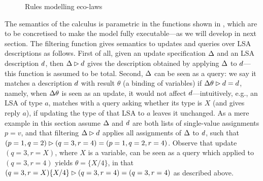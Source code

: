 \documentclass[12pt,a4paper,twoside,openright]{book}
\begin{document}
\begin{figure}{
 } \caption[A process algebra for SAPERE: eco-laws]{Rules modelling eco-laws} \label{fig:eco_laws}
\end{figure}

The semantics of the calculus is parametric in the functions shown in , which are to be concretised to make the model fully executable---as we will develop in next section.
%
The filtering function gives semantics to updates and queries over LSA descriptions as follows.
%
First of all, given an update specification $\Delta$ and an LSA description $d$, then $\Delta\rhd d$ gives the description obtained by applying $\Delta$ to $d$---this function is assumed to be total.
%
Second, $\Delta$ can be seen as a query: we say it matches a description $d$ with result $\theta$ (a binding of variables) if $\Delta\theta\rhd d=d$, namely, when $\Delta\theta$ is seen as an update, it would not affect $d$---intuitively, e.g., an LSA of type $a$, matches with a query asking whether its type is $X$ (and gives reply $a$), if updating the type of that LSA to $a$ leaves it unchanged.
%
As a mere example in this section assume $\Delta$ and $d$ are both lists of single-value assignments $p = v$, and that filtering \mbox{$\Delta\rhd d$} applies all assignments of $\Delta$ to $d$, such that \mbox{$(p=1,q=2)\rhd (q=3,r=4)=(p=1,q=2,r=4)$}. Observe that update $(q=3,r=X)$, where $X$ is a variable, can be seen as a query which applied to $(q=3,r=4)$ yields $\theta=\{X/4\}$, in that \mbox{$(q=3,r=X)\{X/4\}\rhd (q=3,r=4)=(q=3,r=4)$} as described above.
\end{document}
